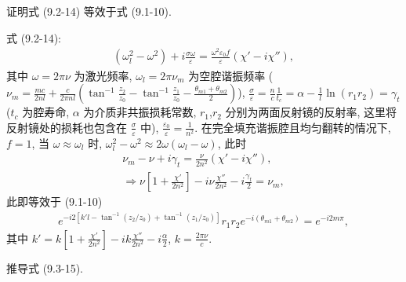 \documentclass{note}
\begin{document}
\begin{exe}
    证明式 (9.2-14) 等效于式 (9.1-10).
\end{exe}
\begin{pf}
    式 (9.2-14):
    \begin{align}
        (\omega_l^2-\omega^2)+i\frac{\sigma\omega}{\varepsilon}=\frac{\omega^2\varepsilon_0f}{\varepsilon}(\chi'-i\chi''),
    \end{align}
    其中 $\omega=2\pi\nu$ 为激光频率, $\omega_l=2\pi\nu_m$ 为空腔谐振频率 ($\nu_m=\frac{mc}{2nl}+\frac{c}{2\pi nl}\left(\tan^{-1}\frac{z_2}{z_0}-\tan^{-1}\frac{z_1}{z_0}-\frac{\theta_{m1}+\theta_{m2}}{2}\right)$), $\frac{\sigma}{\varepsilon}=\frac{n}{c}\frac{1}{t_c}=\alpha-\frac{1}{l}\ln(r_1r_2)=\gamma_t$ ($t_c$ 为腔寿命, $\alpha$ 为介质非共振损耗常数, $r_1$,$r_2$ 分别为两面反射镜的反射率, 这里将反射镜处的损耗也包含在 $\frac{\sigma}{\varepsilon}$ 中), $\frac{\varepsilon_0}{\varepsilon}=\frac{1}{n^2}$.
    在完全填充谐振腔且均匀翻转的情况下, $f=1$, 当 $\omega\approx\omega_l$ 时, $\omega_l^2-\omega^2\approx 2\omega(\omega_l-\omega)$, 此时
    \begin{gather}
        \nu_m-\nu+i\gamma_t=\frac{\nu}{2n^2}(\chi'-i\chi''),\\
        \Longrightarrow\nu\left[1+\frac{\chi'}{2n^2}\right]-i\nu\frac{\chi''}{2n^2}-i\frac{\gamma_t}{2}=\nu_m,
    \end{gather}
    此即等效于 (9.1-10)
    \begin{align}
        e^{-i2[k'l-\tan^{-1}(z_2/z_0)+\tan^{-1}(z_1/z_0)]}r_1r_2e^{-i(\theta_{m1}+\theta_{m2})}=e^{-i2m\pi},
    \end{align}
    其中 $k'=k\left[1+\frac{\chi'}{2n^2}\right]-ik\frac{\chi''}{2n^2}-i\frac{\alpha}{2}$, $k=\frac{2\pi\nu}{c}$.
\end{pf}

\begin{exe}
    推导式 (9.3-15).
\end{exe}
\begin{pf}
    
\end{pf}
\ifx\allfiles\undefined
\end{document}
